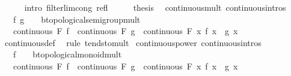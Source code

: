 \begin{isabellebody}
\ \ \ \ \isamarkupfalse%
\ {\isacharparenleft}{\kern0pt}intro\ filterlim{\isacharunderscore}{\kern0pt}cong\ refl{\isacharparenright}{\kern0pt}\isanewline
\ \ \isamarkupfalse%
\ \isamarkupfalse%
\ {\isacharquery}{\kern0pt}thesis\ \isacommand{{\isachardot}{\kern0pt}}\isamarkupfalse%
\isanewline
{}\isamarkupfalse%
%
\endisatagproof
{\isafoldproof}%
%
\isadelimproof
\isanewline
%
\endisadelimproof
\isanewline
{}\isamarkupfalse%
\ continuous{\isacharunderscore}{\kern0pt}mult{\isacharprime}{\kern0pt}\ {\isacharbrackleft}{\kern0pt}continuous{\isacharunderscore}{\kern0pt}intros{\isacharbrackright}{\kern0pt}{\isacharcolon}{\kern0pt}\isanewline
\ \ \ f\ g\ {\isacharcolon}{\kern0pt}{\isacharcolon}{\kern0pt}\ {\isachardoublequoteopen}{\isacharunderscore}{\kern0pt}\ {\isasymRightarrow}\ {\isacharprime}{\kern0pt}b{\isacharcolon}{\kern0pt}{\isacharcolon}{\kern0pt}topological{\isacharunderscore}{\kern0pt}semigroup{\isacharunderscore}{\kern0pt}mult{\isachardoublequoteclose}\isanewline
\ \ \ {\isachardoublequoteopen}continuous\ F\ f\ {\isasymLongrightarrow}\ continuous\ F\ g\ {\isasymLongrightarrow}\ continuous\ F\ {\isacharparenleft}{\kern0pt}{\isasymlambda}x{\isachardot}{\kern0pt}\ f\ x\ {\isacharasterisk}{\kern0pt}\ g\ x{\isacharparenright}{\kern0pt}{\isachardoublequoteclose}\isanewline
%
\isadelimproof
\ \ %
\endisadelimproof
%
\isatagproof
{}\isamarkupfalse%
\ continuous{\isacharunderscore}{\kern0pt}def\ \isamarkupfalse%
\ {\isacharparenleft}{\kern0pt}rule\ tendsto{\isacharunderscore}{\kern0pt}mult{\isacharparenright}{\kern0pt}%
\endisatagproof
{\isafoldproof}%
%
\isadelimproof
\isanewline
%
\endisadelimproof
\isanewline
{}\isamarkupfalse%
\ continuous{\isacharunderscore}{\kern0pt}power{\isacharprime}{\kern0pt}\ {\isacharbrackleft}{\kern0pt}continuous{\isacharunderscore}{\kern0pt}intros{\isacharbrackright}{\kern0pt}{\isacharcolon}{\kern0pt}\isanewline
\ \ \ f\ {\isacharcolon}{\kern0pt}{\isacharcolon}{\kern0pt}\ {\isachardoublequoteopen}{\isacharunderscore}{\kern0pt}\ {\isasymRightarrow}\ {\isacharprime}{\kern0pt}b{\isacharcolon}{\kern0pt}{\isacharcolon}{\kern0pt}topological{\isacharunderscore}{\kern0pt}monoid{\isacharunderscore}{\kern0pt}mult{\isachardoublequoteclose}\isanewline
\ \ \ {\isachardoublequoteopen}continuous\ F\ f\ {\isasymLongrightarrow}\ continuous\ F\ g\ {\isasymLongrightarrow}\ continuous\ F\ {\isacharparenleft}{\kern0pt}{\isasymlambda}x{\isachardot}{\kern0pt}\ f\ x\ {\isacharcircum}{\kern0pt}\ g\ x{\isacharparenright}{\kern0pt}{\isachardoublequoteclose}\isanewline

\end{isabellebody}
